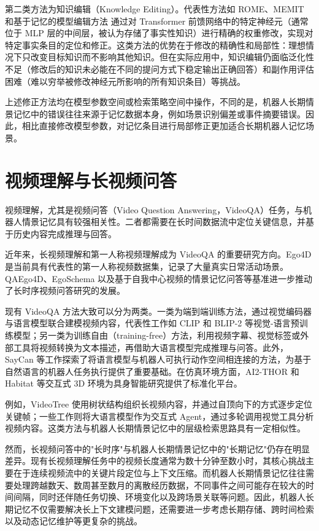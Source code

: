 第二类方法为知识编辑（Knowledge Editing）。代表性方法如 ROME\cite{meng2022rome}、MEMIT\cite{meng2023memit} 和基于记忆的模型编辑方法\cite{mitchell2022memory} 通过对 Transformer 前馈网络中的特定神经元（通常位于 MLP 层的中间层，被认为存储了事实性知识）进行精确的权重修改，实现对特定事实条目的定位和修正。这类方法的优势在于修改的精确性和局部性：理想情况下只改变目标知识而不影响其他知识。但在实际应用中，知识编辑仍面临泛化性不足（修改后的知识未必能在不同的提问方式下稳定输出正确回答）和副作用评估困难（难以穷举被修改神经元所影响的所有知识条目）等挑战。

上述修正方法均在模型参数空间或检索策略空间中操作，不同的是，机器人长期情景记忆中的错误往往来源于记忆数据本身，例如场景识别偏差或事件摘要错误。因此，相比直接修改模型参数，对记忆条目进行局部修正更加适合长期机器人记忆场景。

\section{视频理解与长视频问答}

视频理解，尤其是视频问答（Video Question Answering，VideoQA）任务，与机器人情景记忆具有较强相关性。二者都需要在长时间数据流中定位关键信息，并基于历史内容完成推理与回答。

近年来，长视频理解和第一人称视频理解成为 VideoQA 的重要研究方向。Ego4D\cite{grauman2022ego4d} 是当前具有代表性的第一人称视频数据集，记录了大量真实日常活动场景。QAEgo4D\cite{datta2022emqa}、EgoSchema\cite{mangalam2023egoschema} 以及基于自我中心视频的情景记忆问答\cite{barmann2022egocentric}等基准进一步推动了长时序视频问答研究的发展。

现有 VideoQA 方法大致可以分为两类。一类为端到端训练方法，通过视觉编码器与语言模型联合建模视频内容，代表性工作如 CLIP\cite{radford2021clip} 和 BLIP-2\cite{li2023blip2} 等视觉-语言预训练模型；另一类为训练自由（training-free）方法，利用视频字幕、视觉标签或外部工具将视频转换为文本描述，再借助大语言模型完成推理与问答。此外，SayCan\cite{ahn2022saycan} 等工作探索了将语言模型与机器人可执行动作空间相连接的方法，为基于自然语言的机器人任务执行提供了重要基础。在仿真环境方面，AI2-THOR\cite{kolve2017ai2thor} 和 Habitat\cite{savva2019habitat} 等交互式 3D 环境为具身智能研究提供了标准化平台。

例如，VideoTree 使用树状结构组织长视频内容，并通过自顶向下的方式逐步定位关键帧；一些工作则将大语言模型作为交互式 Agent，通过多轮调用视觉工具分析视频内容。这类方法与机器人长期情景记忆中的层级检索思路具有一定相似性。

然而，长视频问答中的"长时序"与机器人长期情景记忆中的"长期记忆"仍存在明显差异。现有长视频理解任务中的视频长度通常为数十分钟至数小时，其核心挑战主要在于连续视频流中的关键片段定位与上下文压缩。而机器人长期情景记忆往往需要处理跨越数天、数周甚至数月的离散经历数据，不同事件之间可能存在较大的时间间隔，同时还伴随任务切换、环境变化以及跨场景关联等问题。因此，机器人长期记忆不仅需要解决长上下文建模问题，还需要进一步考虑长期存储、跨时间检索以及动态记忆维护等更复杂的挑战。

